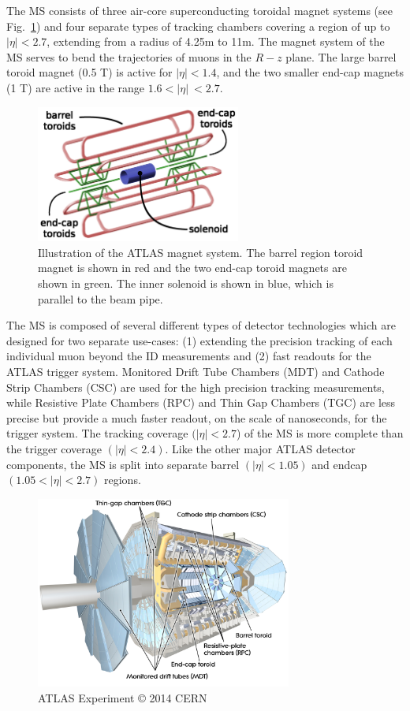 The MS consists of three air-core superconducting toroidal magnet systems (see Fig.~\ref{fig:ATLAS_magnet_system}) and four separate types of tracking chambers covering a region of up to $|\eta| < 2.7$, extending from a radius of 4.25m to 11m.
The magnet system of the MS serves to bend the trajectories of muons in the $R-z$ plane.
The large barrel toroid magnet (0.5 T) is active for $|\eta| < 1.4$, and the two smaller end-cap magnets (1 T) are active in the range $1.6 < |\eta|\ < 2.7$.

\begin{figure}
	\centering
	\includegraphics[width=0.6\textwidth]{magnet_systems}
	\caption{Illustration of the ATLAS magnet system. \cite{CERN-LHCC-97-018}
	The barrel region toroid magnet is shown in red and the two end-cap toroid magnets are shown in green. The inner solenoid is shown in blue, which is parallel to the beam pipe.}
	\label{fig:ATLAS_magnet_system}
\end{figure}

The MS is composed of several different types of detector technologies which are designed for two separate use-cases: (1) extending the precision tracking of each individual muon beyond the ID measurements and (2) fast readouts for the ATLAS trigger system.
Monitored Drift Tube Chambers (MDT) and Cathode Strip Chambers (CSC) are used for the high precision tracking measurements, while Resistive Plate Chambers (RPC) and Thin Gap Chambers (TGC) are less precise but provide a much faster readout, on the scale of nanoseconds, for the trigger system.
The tracking coverage $(|\eta| < 2.7$) of the MS is more complete than the trigger coverage $(|\eta| < 2.4)$.
Like the other major ATLAS detector components, the MS is split into separate barrel $(|\eta| < 1.05)$ and endcap $(1.05 < |\eta| < 2.7)$ regions.

\begin{figure}
	\centering
	\includegraphics[width=0.75\textwidth]{muon_subsystem}
	\caption{ATLAS Experiment © 2014 CERN}
\end{figure}

